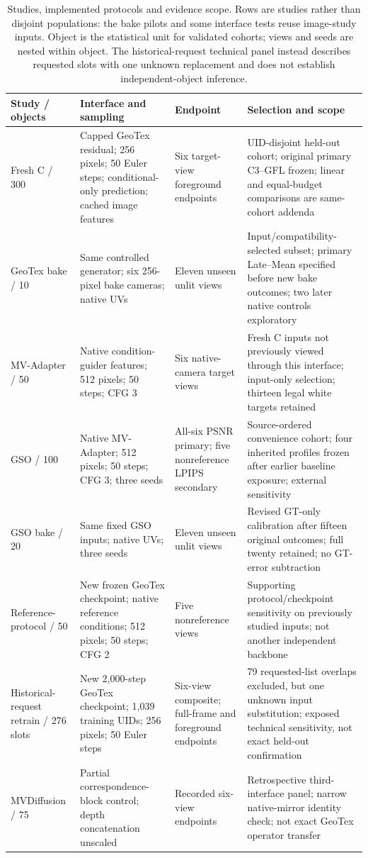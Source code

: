 \documentclass[times,twocolumn,final]{elsarticle}
\begin{document}
\begin{table}[t]
\centering\scriptsize\setlength{\tabcolsep}{3pt}
\caption{Studies, implemented protocols and evidence scope. Rows are studies rather than disjoint populations: the bake pilots and some interface tests reuse image-study inputs. Object is the statistical unit for validated cohorts; views and seeds are nested within object. The historical-request technical panel instead describes requested slots with one unknown replacement and does not establish independent-object inference.}
\label{tab:study-design}
\begin{tabular}{p{}p{}p{}p{}}
\toprule Study / objects & Interface and sampling & Endpoint & Selection and scope \\
\midrule
Fresh C / 300 & Capped GeoTex residual; 256 pixels; 50 Euler steps; conditional-only prediction; cached image features & Six target-view foreground endpoints & UID-disjoint held-out cohort; original primary C3--GFL frozen; linear and equal-budget comparisons are same-cohort addenda \\
GeoTex bake / 10 & Same controlled generator; six 256-pixel bake cameras; native UVs & Eleven unseen unlit views & Input/compatibility-selected subset; primary Late--Mean specified before new bake outcomes; two later native controls exploratory \\
MV-Adapter / 50 & Native condition-guider features; 512 pixels; 50 steps; CFG 3 & Six native-camera target views & Fresh C inputs not previously viewed through this interface; input-only selection; thirteen legal white targets retained \\
GSO / 100 & Native MV-Adapter; 512 pixels; 50 steps; CFG 3; three seeds & All-six PSNR primary; five nonreference LPIPS secondary & Source-ordered convenience cohort; four inherited profiles frozen after earlier baseline exposure; external sensitivity \\
GSO bake / 20 & Same fixed GSO inputs; native UVs; three seeds & Eleven unseen unlit views & Revised GT-only calibration after fifteen original outcomes; full twenty retained; no GT-error subtraction \\
Reference-protocol / 50 & New frozen GeoTex checkpoint; native reference conditions; 512 pixels; 50 steps; CFG 2 & Five nonreference views & Supporting protocol/checkpoint sensitivity on previously studied inputs; not another independent backbone \\
Historical-request retrain / 276 slots & New 2,000-step GeoTex checkpoint; 1,039 training UIDs; 256 pixels; 50 Euler steps & Six-view composite; full-frame and foreground endpoints & 79 requested-list overlaps excluded, but one unknown input substitution; exposed technical sensitivity, not exact held-out confirmation \\
MVDiffusion / 75 & Partial correspondence-block control; depth concatenation unscaled & Recorded six-view endpoints & Retrospective third-interface panel; narrow native-mirror identity check; not exact GeoTex operator transfer \\
\bottomrule
\end{tabular}
\end{table}
\end{document}
